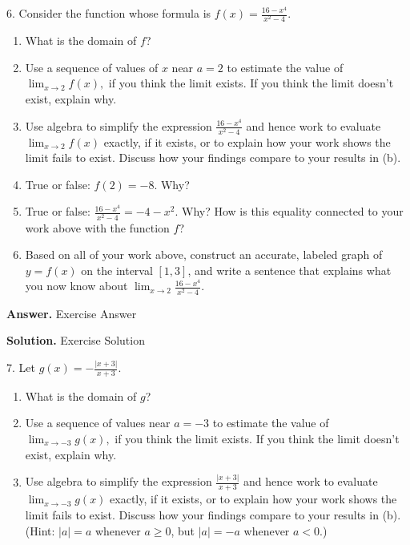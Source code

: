 \documentclass[10pt,]{book}
\theoremstyle{plain}
\theoremstyle{definition}
\theoremstyle{definition}
\theoremstyle{definition}
\theoremstyle{definition}
\theoremstyle{definition}
\numberwithin{equation}{section}
\newcommand{\lt}{ < }
\begin{document}
\begin{exerciselist}
\item[6.]\hypertarget{ez-1-2-Rational}{}
          Consider the function whose formula is \(f(x) = \frac{16-x^4}{x^2-4}\).
\leavevmode%
\begin{enumerate}[label=\alph*]
\item\hypertarget{li-88}{}What is the domain of \(f\)?%
\item\hypertarget{li-89}{}Use a sequence of values of \(x\) near \(a = 2\) to estimate the value of \(\lim_{x \to 2} f(x),\)
              if you think the limit exists.  If you think the limit doesn't exist, explain why.%
\item\hypertarget{li-90}{}Use algebra to simplify the expression \(\frac{16-x^4}{x^2-4}\) and hence work to evaluate \(\lim_{x \to 2} f(x)\) exactly, if it exists, or to explain how your work shows the limit fails to exist.  Discuss how your findings compare to your results in (b).%
\item\hypertarget{li-91}{}True or false: \(f(2) = -8\).  Why?%
\item\hypertarget{li-92}{}True or false: \(\frac{16-x^4}{x^2-4} = -4-x^2.\)  Why?  How is this equality connected to your work above with the function \(f\)?%
\item\hypertarget{li-93}{}Based on all of your work above, construct an accurate, labeled graph of \(y = f(x)\) on the interval \([1,3]\), and write a sentence that explains what you now know about \(\lim_{x \to 2} \frac{16-x^4}{x^2-4}\).%
\end{enumerate}
\par\smallskip
\par\smallskip
\noindent\textbf{Answer.}\hypertarget{answer-10}{}\quad
Exercise Answer%
\par\smallskip
\noindent\textbf{Solution.}\hypertarget{solution-12}{}\quad
Exercise Solution%
\item[7.]\hypertarget{ez-1-2-abs-val}{}Let \(g(x) = -\frac{|x+3|}{x+3}\).%
\leavevmode%
\begin{enumerate}[label=\alph*]
\item\hypertarget{li-94}{}What is the domain of \(g\)?%
\item\hypertarget{li-95}{}Use a sequence of values near \(a = -3\) to estimate the value of \(\lim_{x \to -3} g(x),\)
            if you think the limit exists.  If you think the limit doesn't exist, explain why.%
\item\hypertarget{li-96}{}Use algebra to simplify the expression \(\frac{|x+3|}{x+3}\) and hence work to evaluate \(\lim_{x \to -3} g(x)\) exactly, if it exists, or to explain how your work shows the limit fails to exist.  Discuss how your findings compare to your results in (b).  (Hint: \(|a| = a\) whenever \(a \ge 0\), but \(|a| = -a\) whenever \(a \lt  0\).)%

\end{enumerate}
\end{exerciselist}
\end{document}
